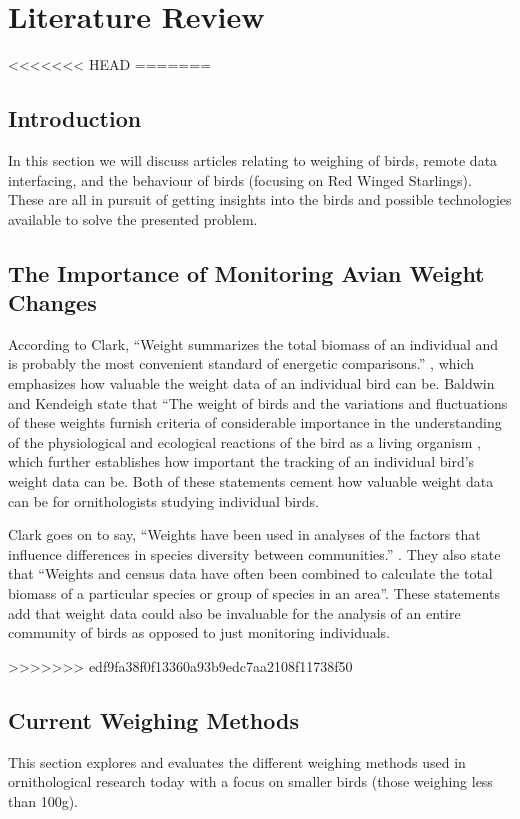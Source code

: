 \documentclass[class=report,11pt,crop=false]{standalone}
\begin{document}
\ifstandalone
\tableofcontents
\fi
\chapter{Literature Review \label{ch:literature}}
\vspace{0.5cm}
<<<<<<< HEAD
=======

\section{Introduction}
In this section we will discuss articles relating to weighing of birds, remote data interfacing, and the behaviour of birds (focusing on Red Winged Starlings). These are all in pursuit of getting insights into the birds and possible technologies available to solve the presented problem.

\section{The Importance of Monitoring Avian Weight Changes}
According to Clark, “Weight summarizes the total biomass of an individual and is probably the most convenient standard of energetic comparisons.” \cite{ClarckWeights}, which emphasizes how valuable the weight data of an individual bird can be. Baldwin and Kendeigh state that “The weight of birds and the variations and fluctuations of these weights furnish criteria of considerable importance in the understanding of the physiological and ecological reactions of the bird as a living organism \cite{BaldwinWeights}, which further establishes how important the tracking of an individual bird’s weight data can be. Both of these statements cement how valuable weight data can be for ornithologists studying individual birds.

Clark goes on to say, “Weights have been used in analyses of the factors that influence differences in species diversity between communities.” \cite{ClarckWeights}. They also state that “Weights and census data have often been combined to calculate the total biomass of a particular species or group of species in an area”. These statements add that weight data could also be invaluable for the analysis of an entire community of birds as opposed to just monitoring individuals.

>>>>>>> edf9fa38f0f13360a93b9edc7aa2108f11738f50
\section{Current Weighing Methods}
This section explores and evaluates the different weighing methods used in ornithological research today with a focus on smaller birds (those weighing less than 100g).
\end{document}
